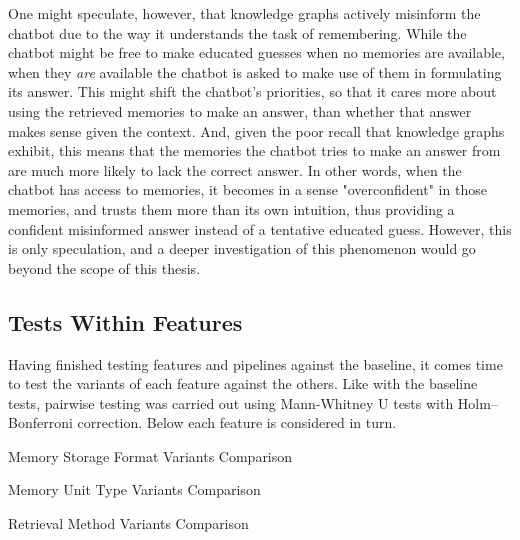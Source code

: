 One might speculate, however, that knowledge graphs actively misinform the chatbot due to the way it understands the task of remembering. While the chatbot might be free to make educated guesses when no memories are available, when they \textit{are} available the chatbot is asked to make use of them in formulating its answer. This might shift the chatbot's priorities, so that it cares more about using the retrieved memories to make an answer, than whether that answer makes sense given the context. And, given the poor recall that knowledge graphs exhibit, this means that the memories the chatbot tries to make an answer from are much more likely to lack the correct answer. In other words, when the chatbot has access to memories, it becomes in a sense "overconfident" in those memories, and trusts them more than its own intuition, thus providing a confident misinformed answer instead of a tentative educated guess. However, this is only speculation, and a deeper investigation of this phenomenon would go beyond the scope of this thesis.



\subsection{Tests Within Features}

Having finished testing features and pipelines against the baseline, it comes time to test the variants of each feature against the others. Like with the baseline tests, pairwise testing was carried out using Mann-Whitney U tests with Holm–Bonferroni correction. Below each feature is considered in turn.

\begin{table}[p]
\centering
\tiny

\caption{Memory Storage Format Variants Comparison}
\label{tab:memory_storage_format_variants_comparison_table}
\end{table}

\begin{table}[p]
\centering
\tiny

\caption{Memory Unit Type Variants Comparison}
\label{tab:memory_unit_type_variants_comparison_table}
\end{table}

\begin{table}[p]
\centering
\tiny

\caption{Retrieval Method Variants Comparison}
\label{tab:retrieval_method_variants_comparison_table}
\end{table}

